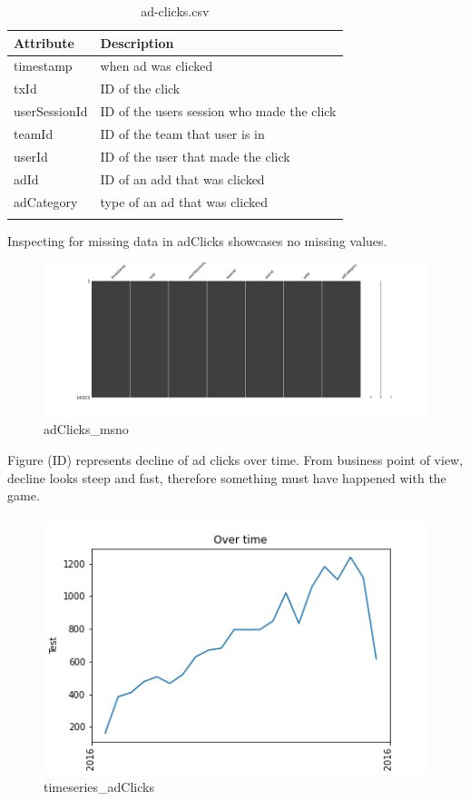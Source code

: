 \begin{center}
\begin{longtable}{ |l|l| } 
 \hline
 Attribute & Description\\ 
 \hline
 timestamp & when ad was clicked\\ 
 \hline
 txId & ID of the click\\ 
 \hline
 userSessionId & ID of the users session who made the click\\ 
 \hline
 teamId & ID of the team that user is in\\ 
 \hline
 userId & ID of the user that made the click\\ 
 \hline
 adId & ID of an add that was clicked\\ 
 \hline
 adCategory & type of an ad that was clicked\\ 
 \hline
\caption{ad-clicks.csv}
\end{longtable}
\end{center}

Inspecting for missing data in adClicks showcases no missing values.
\begin{figure}[H]
\includegraphics[scale=0.25]{img/Graphs/adClicks/missingno_adClicks.png}
\centering
\caption{adClicks\_msno}
\label{fig:adClicks_msno}
\end{figure}

Figure (ID) represents decline of ad clicks over time. From business point of view, decline looks steep and fast, therefore something must have happened with the game.
\begin{figure}[H]
\includegraphics[scale=0.85]{img/Graphs/adClicks/timeseries_adClicks.png}
\centering
\caption{timeseries\_adClicks}
\label{fig:timeseries_adClicks}
\end{figure}

